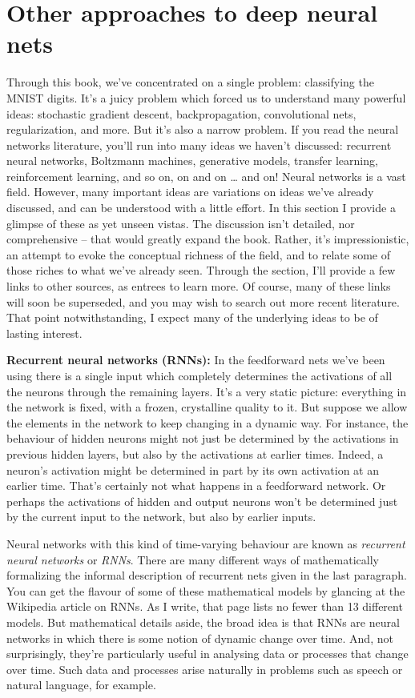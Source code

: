 \documentclass[a4paper,twoside,10pt]{book}
\begin{document}
\section{Other approaches to deep neural nets}
Through this book, we've concentrated on a single problem: classifying the MNIST digits. It's a juicy problem which forced us to understand many powerful ideas: stochastic gradient descent, backpropagation, convolutional nets, regularization, and more. But it's also a narrow problem. If you read the neural networks literature, you'll run into many ideas we haven't discussed: recurrent neural networks, Boltzmann machines, generative models, transfer learning, reinforcement learning, and so on, on and on … and on! Neural networks is a vast field. However, many important ideas are variations on ideas we've already discussed, and can be understood with a little effort. In this section I provide a glimpse of these as yet unseen vistas. The discussion isn't detailed, nor comprehensive -- that would greatly expand the book. Rather, it's impressionistic, an attempt to evoke the conceptual richness of the field, and to relate some of those riches to what we've already seen. Through the section, I'll provide a few links to other sources, as entrees to learn more. Of course, many of these links will soon be superseded, and you may wish to search out more recent literature. That point notwithstanding, I expect many of the underlying ideas to be of lasting interest.

\textbf{Recurrent neural networks (RNNs):} In the feedforward nets we've been using there is a single input which completely determines the activations of all the neurons through the remaining layers. It's a very static picture: everything in the network is fixed, with a frozen, crystalline quality to it. But suppose we allow the elements in the network to keep changing in a dynamic way. For instance, the behaviour of hidden neurons might not just be determined by the activations in previous hidden layers, but also by the activations at earlier times. Indeed, a neuron's activation might be determined in part by its own activation at an earlier time. That's certainly not what happens in a feedforward network. Or perhaps the activations of hidden and output neurons won't be determined just by the current input to the network, but also by earlier inputs.

Neural networks with this kind of time-varying behaviour are known as \textit{recurrent neural networks} or \textit{RNNs}. There are many different ways of mathematically formalizing the informal description of recurrent nets given in the last paragraph. You can get the flavour of some of these mathematical models by glancing at the Wikipedia article on RNNs. As I write, that page lists no fewer than 13 different models. But mathematical details aside, the broad idea is that RNNs are neural networks in which there is some notion of dynamic change over time. And, not surprisingly, they're particularly useful in analysing data or processes that change over time. Such data and processes arise naturally in problems such as speech or natural language, for example.
\end{document}
